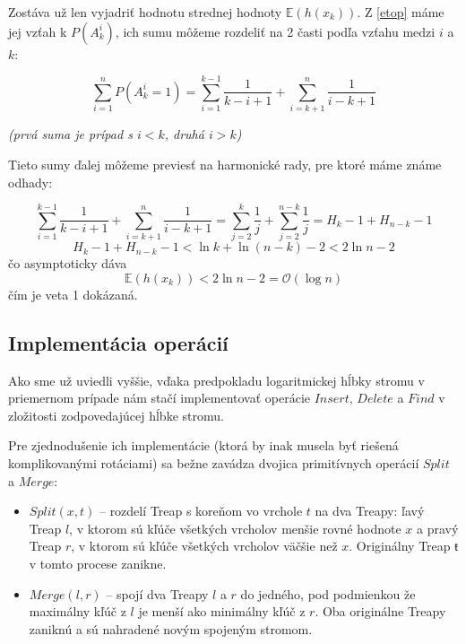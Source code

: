 \documentclass[a4paper, 12pt]{article}
\theoremstyle{definition}
\begin{document}
Zostáva už len vyjadriť hodnotu strednej hodnoty $\mathbb{E}(h(x_k))$. Z
\ref{etop} máme jej vzťah k $P(A^i_k)$, ich sumu môžeme rozdeliť na 2 časti
podľa vzťahu medzi $i$ a $k$:

\begin{equation}
    \sum_{i=1}^n P(A^i_k = 1) = \sum_{i=1}^{k-1} \frac{1}{k-i+1} +
    \sum_{i=k+1}^{n} \frac{1}{i-k+1}
\end{equation}

\begin{center}
\emph{(prvá suma je prípad s $i < k$, druhá $i > k$)}
\end{center}

Tieto sumy ďalej môžeme previesť na harmonické rady, pre ktoré máme známe
odhady:

\begin{equation}
    \sum_{i=1}^{k-1} \frac{1}{k-i+1} + \sum_{i=k+1}^{n} \frac{1}{i-k+1}
    = \sum_{j=2}^{k} \frac{1}{j} + \sum_{j=2}^{n-k} \frac{1}{j}
    = H_k - 1 + H_{n-k} - 1
\end{equation}
\begin{equation}
    H_k - 1 + H_{n-k} - 1 < \ln k + \ln(n-k) - 2 < 2 \ln n - 2
\end{equation}
čo asymptoticky dáva
\begin{equation}
    \mathbb{E}(h(x_k)) < 2 \ln n - 2 = \mathcal{O}(\log n)
\end{equation}
čím je veta 1 dokázaná.

\subsection{Implementácia operácií}

Ako sme už uviedli vyššie, vďaka predpokladu logaritmickej hĺbky stromu v
priemernom prípade nám stačí implementovať operácie $Insert$, $Delete$ a $Find$
v zložitosti zodpovedajúcej hĺbke stromu. 

Pre zjednodušenie ich implementácie (ktorá by inak musela byť riešená
komplikovanými rotáciami) sa bežne zavádza dvojica primitívnych operácií
$Split$ a $Merge$:

\begin{itemize}
    \item $Split(x, t)$ -- rozdelí Treap s koreňom vo vrchole $t$ na dva
        Treapy: ľavý Treap $l$, v ktorom sú kľúče všetkých vrcholov menšie
        rovné hodnote $x$ a pravý Treap $r$, v ktorom sú kľúče všetkých
        vrcholov väčšie než $x$.  Originálny Treap $ŧ$ v tomto procese zanikne.
    \item $Merge(l, r)$ -- spojí dva Treapy $l$ a $r$ do jedného, pod
        podmienkou že maximálny kľúč z $l$ je menší ako minimálny kľúč z $r$.
        Oba originálne Treapy zaniknú a sú nahradené novým spojeným stromom.
\end{itemize}
\end{document}
